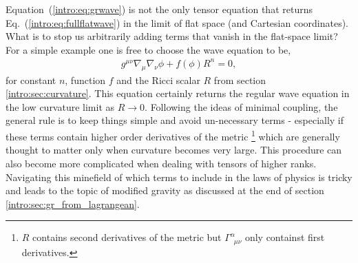 Equation~(\ref{intro:eq:grwave}) is not the only tensor equation that returns Eq.~(\ref{intro:eq:fullflatwave}) in the limit of flat space (and Cartesian coordinates). What is to stop us arbitrarily adding terms that vanish in the flat-space limit? For a simple example one is free to choose the wave equation to be,
\begin{align}
g^{\mu\nu}\nabla_\mu\nabla_\nu \phi + f(\phi) R^n = 0, \label{intro:eq:modified_wave}
\end{align}
for constant $n$, function $f$ and the Ricci scalar $R$ from section
\ref{intro:sec:curvature}. This equation certainly returns the regular wave equation
in the low curvature limit as $R\rightarrow 0$. Following the ideas of minimal
coupling, the general rule is to keep things simple and avoid un-necessary terms -
especially if these terms contain higher order derivatives of the metric
\footnote{$R$ contains second derivatives of the metric but $\Gamma^\alpha_{\,\,\,\mu\nu}$
only containst first derivatives.}
which are generally thought to matter only when curvature becomes very large.
This procedure can also become more complicated
when dealing with tensors of higher ranks. Navigating this minefield of which terms to
include in the laws of physics is tricky and leads to the topic of modified gravity
as discussed at the end of section \ref{intro:sec:gr_from_lagrangean}.





